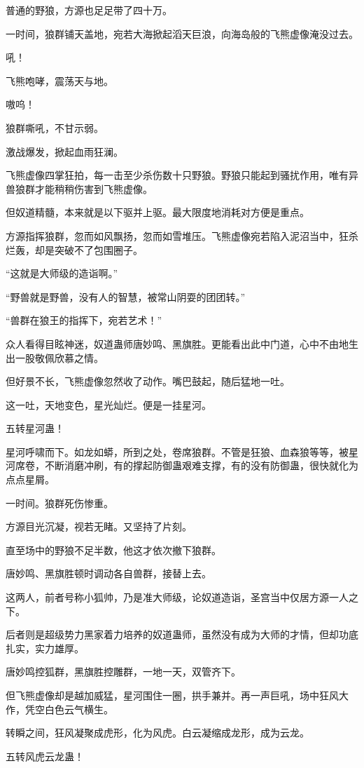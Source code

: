 \begin{this_body}
普通的野狼，方源也足足带了四十万。

一时间，狼群铺天盖地，宛若大海掀起滔天巨浪，向海岛般的飞熊虚像淹没过去。

吼！

飞熊咆哮，震荡天与地。

嗷呜！

狼群嘶吼，不甘示弱。

激战爆发，掀起血雨狂澜。

飞熊虚像四掌狂拍，每一击至少杀伤数十只野狼。野狼只能起到骚扰作用，唯有异兽狼群才能稍稍伤害到飞熊虚像。

但奴道精髓，本来就是以下驱并上驱。最大限度地消耗对方便是重点。

方源指挥狼群，忽而如风飘扬，忽而如雪堆压。飞熊虚像宛若陷入泥沼当中，狂杀烂轰，却是突破不了包围圈子。

“这就是大师级的造诣啊。”

“野兽就是野兽，没有人的智慧，被常山阴耍的团团转。”

“兽群在狼王的指挥下，宛若艺术！”

众人看得目眩神迷，奴道蛊师唐妙鸣、黑旗胜。更能看出此中门道，心中不由地生出一股敬佩欣慕之情。

但好景不长，飞熊虚像忽然收了动作。嘴巴鼓起，随后猛地一吐。

这一吐，天地变色，星光灿烂。便是一挂星河。

五转星河蛊！

星河呼啸而下。如龙如蟒，所到之处，卷席狼群。不管是狂狼、血森狼等等，被星河席卷，不断消磨冲刷，有的撑起防御蛊艰难支撑，有的没有防御蛊，很快就化为点点星屑。

一时间。狼群死伤惨重。

方源目光沉凝，视若无睹。又坚持了片刻。

直至场中的野狼不足半数，他这才依次撤下狼群。

唐妙鸣、黑旗胜顿时调动各自兽群，接替上去。

这两人，前者号称小狐帅，乃是准大师级，论奴道造诣，圣宫当中仅居方源一人之下。

后者则是超级势力黑家着力培养的奴道蛊师，虽然没有成为大师的才情，但却功底扎实，实力雄厚。

唐妙鸣控狐群，黑旗胜控雕群，一地一天，双管齐下。

但飞熊虚像却是越加威猛，星河围住一圈，拱手兼并。再一声巨吼，场中狂风大作，凭空白色云气横生。

转瞬之间，狂风凝聚成虎形，化为风虎。白云凝缩成龙形，成为云龙。

五转风虎云龙蛊！


\end{this_body}
